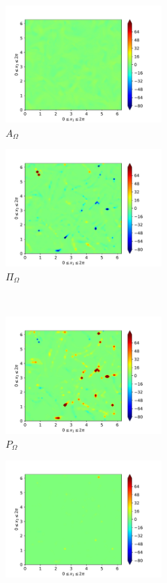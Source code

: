 \begin{figure}[H]
\begin{subfigure}{0.45\textwidth}
        \includegraphics[height=1.75in]{media/run-cds-65/A-enst-1335}
        \caption{$A_{\Omega}$}
    \end{subfigure}
    \newline
    \begin{subfigure}{0.45\textwidth}
        \includegraphics[height=1.75in]{media/run-cds-65/Pi-enst-1335}
        \caption{$\Pi_{\Omega}$}
    \end{subfigure}
    ~
    \begin{subfigure}{0.45\textwidth}
        \includegraphics[height=1.75in]{media/run-cds-65/P-enst-1335}
        \caption{$P_{\Omega}$}
    \end{subfigure}
    \newline
    \begin{subfigure}{0.45\textwidth}
        \includegraphics[height=1.75in]{media/run-cds-65/B-enst-1335}

\end{subfigure}
\end{figure}
